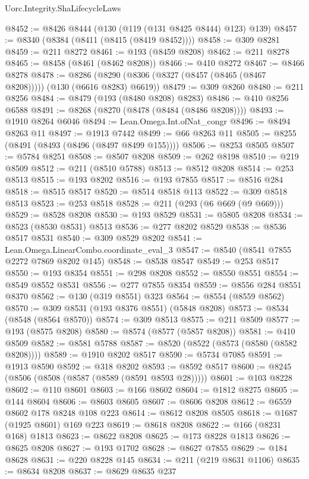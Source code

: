 \begin{lexlean}{Uorc.Integrity.ShaLifecycleLaws}
\begin{coremodule}
@8452 := @8426 @8444 (@130 (@119 (@131 @8425 @8444) @123) @139)
@8457 := @8340 (@8384 (@8411 (@8415 (@8419 @8452))))
@8458 := @309 @8281
@8459 := @211 @8272
@8461 := @193 (@8459 @8208)
@8462 := @211 @8278
@8465 := @8458 (@8461 (@8462 @8208))
@8466 := @410 @8272
@8467 := @8466 @8278
@8478 := @8286 (@8290 (@8306 (@8327 (@8457 (@8465 (@8467 @8208))))) (@130 (@6616 @8283) @6619))
@8479 := @309 @8260
@8480 := @211 @8256
@8484 := @8479 (@193 (@8480 @8208) @8283)
@8486 := @410 @8256 @6588
@8491 := @8268 (@8270 (@8478 (@8484 (@8486 @8208))))
@8493 := @1910 @8264 @6046
@8494 := Lean.Omega.Int.ofNat_congr
@8496 := @8494 @8263 @11
@8497 := @1913 @7442
@8499 := @66 @8263 @11
@8505 := @8255 (@8491 (@8493 (@8496 (@8497 @8499 @155))))
@8506 := @8253 @8505
@8507 := @5784 @8251
@8508 := @8507 @8208
@8509 := @262 @8198
@8510 := @219 @8509
@8512 := @211 (@8510 @5788)
@8513 := @8512 @8208
@8514 := @253 @8513
@8515 := @193 @8202
@8516 := @193 @7855
@8517 := @8516 @284
@8518 := @8515 @8517
@8520 := @8514 @8518 @113
@8522 := @309 @8518 @8513
@8523 := @253 @8518
@8528 := @211 (@293 (@6 @669 (@9 @669)))
@8529 := @8528 @8208
@8530 := @193 @8529
@8531 := @5805 @8208
@8534 := @8523 (@8530 @8531) @8513
@8536 := @277 @8202 @8529
@8538 := @8536 @8517 @8531
@8540 := @309 @8529 @8202
@8541 := Lean.Omega.LinearCombo.coordinate_eval_3
@8547 := @8540 (@8541 @7855 @2272 @7869 @8202 @145)
@8548 := @8538 @8547
@8549 := @253 @8517
@8550 := @193 @8354
@8551 := @298 @8208
@8552 := @8550 @8551
@8554 := @8549 @8552 @8531
@8556 := @277 @7855 @8354
@8559 := @8556 @284 @8551 @8370
@8562 := @130 (@319 @8551) @323
@8564 := @8554 (@8559 @8562)
@8570 := @309 @8531 (@193 @8376 @8551) (@5848 @8208)
@8573 := @8534 (@8548 (@8564 @8570))
@8574 := @309 @8513
@8575 := @211 @8509
@8577 := @193 (@8575 @8208)
@8580 := @8574 (@8577 (@5857 @8208))
@8581 := @410 @8509
@8582 := @8581 @5788
@8587 := @8520 (@8522 (@8573 (@8580 (@8582 @8208))))
@8589 := @1910 @8202 @8517
@8590 := @5734 @7085
@8591 := @1913 @8590
@8592 := @318 @8202
@8593 := @8592 @8517
@8600 := @8245 (@8506 (@8508 (@8587 (@8589 (@8591 @8593 @28)))))
@8601 := @103 @8228
@8602 := @110 @8601
@8603 := @166 @8602
@8604 := @1812 @8275
@8605 := @144 @8604
@8606 := @8603 @8605
@8607 := @8606 @8208
@8612 := @6559 @8602 @178 @8248 @108 @223
@8614 := @8612 @8208 @8505
@8618 := @1687 (@1925 @8601) @169 @223
@8619 := @8618 @8208
@8622 := @166 (@8231 @168) @1813
@8623 := @8622 @8208
@8625 := @173 @8228 @1813
@8626 := @8625 @8208
@8627 := @193 @1702
@8628 := @8627 @7855
@8629 := @184 @8628
@8631 := @220 @8228 @145
@8634 := @211 (@219 @8631 @1106)
@8635 := @8634 @8208
@8637 := @8629 @8635 @237

\end{coremodule}
\end{lexlean}
